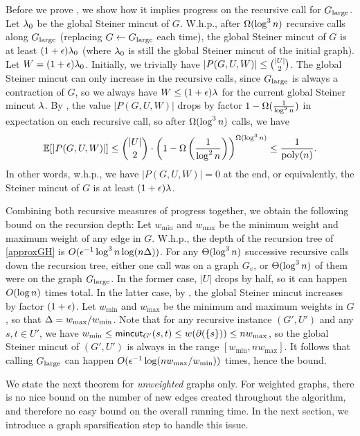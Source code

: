 Before we prove , we show how it implies progress on the recursive call for $G_{\textup{large}}$.
\BC{}
Let $\lambda_0$ be the global Steiner mincut of $G$.
W.h.p., after $\Omega(\log^3n)$ recursive calls along $G_{\textup{large}}$ (replacing $G\gets G_{\textup{large}}$ each time), the global Steiner mincut of $G$ is at least $(1+\epsilon)\lambda_0$ (where $\lambda_0$ is still the global Steiner mincut of the initial graph).
\EC
\BP
Let $W=(1+\epsilon)\lambda_0$.
Initially, we trivially have $|P(G,U,W)|\le\binom{|U|}2$. The global Steiner mincut can only increase in the recursive calls, since $G_{\textup{large}}$ is always a contraction of $G$, so we always have $W\le(1+\epsilon)\lambda$ for the current global Steiner mincut $\lambda$. By , the value $|P(G,U,W)|$ drops by factor $1-\Omega(\frac1{\log^2n})$ in expectation on each recursive call, so after $\Omega(\log^3n)$ calls, we have
\[ \mathbb E[|P(G,U,W)|]\le\binom{|U|}2\cdot\left(1-\Omega\left(\frac1{\log^2n}\right)\right)^{\Omega(\log^3n)}\le\frac1{\textup{poly}(n)} .\]
In other words, w.h.p., we have $|P(G,U,W)|=0$ at the end, or equivalently, the Steiner mincut of $G$ is at least $(1+\epsilon)\lambda$.
\EP

Combining both recursive measures of progress together, we obtain the following bound on the recursion depth:
\BL{}
Let $w_{\min}$ and $w_{\max}$ be the minimum weight and maximum weight of any edge in $G$.
W.h.p., the depth of the recursion tree of \ref{approxGH} is $O(\epsilon^{-1}\log^3n\log(n\Delta))$.
\EL
\BP
For any $\Theta(\log^3n)$ successive recursive calls down the recursion tree, either one call was on a graph $G_v$, or $\Theta(\log^3n)$ of them were on the graph $G_{\textup{large}}$. In the former case, $|U|$ drops by half, so it can happen $O(\log n)$ times total. In the latter case, by , the global Steiner mincut increases by factor $(1+\epsilon)$. Let $w_{\min}$ and $w_{\max}$ be the minimum and maximum weights in $G$, so that $\Delta=w_{\max}/w_{\min}$. Note that for any recursive instance $(G',U')$ and any $s,t\in U'$, we have $w_{\min}\le\textsf{\textup{mincut}}_{G'}(s,t)\le w(\partial(\{s\}))\le nw_{\max}$, so the global Steiner mincut of $(G',U')$ is always in the range $[w_{\min},nw_{\max}]$. It follows that calling $G_{\textup{large}}$ can happen $O(\epsilon^{-1}\log(nw_{\max}/w_{\min}))$ times, hence the bound.
\EP

We state the next theorem for \emph{unweighted} graphs only. For weighted graphs, there is no nice bound on the number of new edges created throughout the algorithm, and therefore no easy bound on the overall running time. In the next section, we introduce a graph sparsification step to handle this issue.


